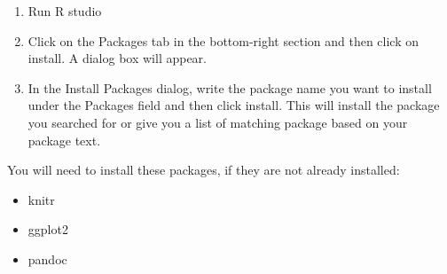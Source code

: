 \documentclass{article}
\begin{document}
\begin{enumerate}
    \item Run R studio
    \item Click on the Packages tab in the bottom-right section and then click on install. A dialog box will appear.
    \item In the Install Packages dialog, write the package name you want to install under the Packages field and then click install. This will install the package you searched for or give you a list of matching package based on your package text.
\end{enumerate}

You will need to install these packages, if they are not already installed:
\begin{itemize}
    \item knitr
    \item ggplot2
    \item pandoc
\end{itemize}
\end{document}
